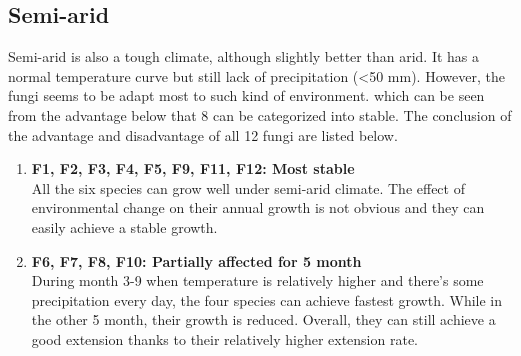 \documentclass[a4paper,12pt]{article}
\begin{document}
\subsection{Semi-arid}
Semi-arid is also a tough climate, although slightly better than arid. It has a normal temperature curve but still lack of precipitation (<50 mm). However, the fungi seems to be adapt most to such kind of environment. which can be seen from the advantage below that 8 can be categorized into stable. The conclusion of the advantage and disadvantage of all 12 fungi are listed below.
\begin{enumerate}
\setlength{\itemsep}{0ex} %
\item \textbf{F1, F2, F3, F4, F5, F9, F11, F12: Most stable} \\
All the six species can grow well under semi-arid climate. The effect of environmental change on their annual growth is not obvious and they can easily achieve a stable growth.
\item \textbf{F6, F7, F8, F10: Partially affected for 5 month}\\
During month 3-9 when temperature is relatively higher and there's some precipitation every day, the four species can achieve fastest growth. While in the other 5 month, their growth is reduced. Overall, they can still achieve a good extension thanks to their relatively higher extension rate.
\end{enumerate}
\end{document}
